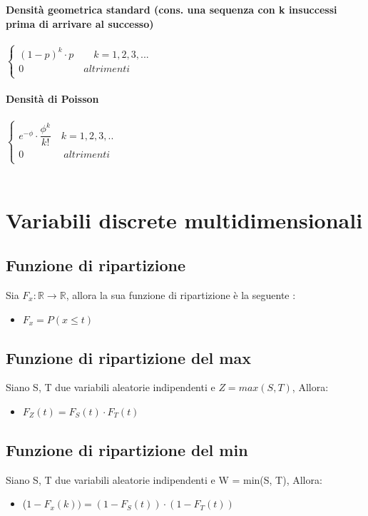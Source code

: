 \textbf{Densità geometrica standard (cons. una sequenza con k insuccessi prima di arrivare al successo)} \\ \\
$
\begin{cases}
	(1 - p)^{k} \cdot p\qquad  k = 1,2,3,... \\  
	0\qquad\qquad\qquad			 altrimenti \\
\end{cases}
$ \\ \\	

\textbf{Densità di Poisson} \\ \\
$
\begin{cases}
	e^{-\phi} \cdot \dfrac{\phi^{k}}{k!}\quad k = 1,2,3,.. \\
	0\qquad\quad\quad			 altrimenti \\
\end{cases}
$ \\ \\	

\newpage

\section{Variabili discrete multidimensionali}
\subsection{Funzione di ripartizione}
Sia $F_{x} : \mathbb{R} \rightarrow \mathbb{R}$, allora la sua funzione di ripartizione è la seguente :
\begin{itemize}
	\item $F_{x} = P(x \leq t)$
\end{itemize}

\subsection{Funzione di ripartizione del max}
Siano S, T due variabili aleatorie indipendenti e $Z = max(S, T)$, Allora: 
\begin{itemize}
	\item $F_{Z}(t) = F_{S}(t) \cdot F_{T}(t)$
\end{itemize}

\subsection{Funzione di ripartizione del min}
Siano S, T due variabili aleatorie indipendenti e W = min(S, T), Allora:
\begin{itemize}
	\item ($1 - F_{x}(k)) = (1 - F_{S}(t)) \cdot (1 - F_{T}(t))$
\end{itemize}

